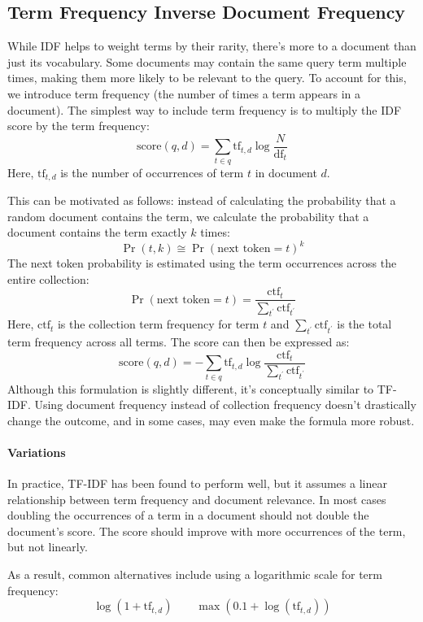 \subsection{Term Frequency Inverse Document Frequency}
While IDF helps to weight terms by their rarity, there's more to a document than just its vocabulary. 
Some documents may contain the same query term multiple times, making them more likely to be relevant to the query. 
To account for this, we introduce term frequency (the number of times a term appears in a document). 
The simplest way to include term frequency is to multiply the IDF score by the term frequency:
\[\text{score}(q,d)=\sum_{t \in q}\text{tf}_{t,d}\log\dfrac{N}{\text{df}_t}\]
Here, $\text{tf}_{t,d}$ is the number of occurrences of term $t$ in document $d$.

This can be motivated as follows: instead of calculating the probability that a random document contains the term, we calculate the probability that a document contains the term exactly $k$ times:
\[\Pr(t,k) \cong  \Pr(\text{next token}=t)^k\]
\noindent The next token probability is estimated using the term occurrences across the entire collection:
\[\Pr(\text{next token} = t) = \frac{\text{ctf}_t}{\sum_{t^\prime}\text{ctf}_{t^{\prime}}}\]
Here, $\text{ctf}_t$ is the collection term frequency for term $t$ and $\sum_{t^\prime}\text{ctf}_{t^{\prime}}$ is the total term frequency across all terms. 
The score can then be expressed as:
\[\text{score}(q,d) = - \sum_{t\in q} \text{tf}_{t,d} \log\frac{\text{ctf}_t}{\sum_{t^\prime}\text{ctf}_{t^\prime}}\] 
\noindent Although this formulation is slightly different, it's conceptually similar to TF-IDF. 
Using document frequency instead of collection frequency doesn't drastically change the outcome, and in some cases, may even make the formula more robust.

\paragraph*{Variations}
In practice, TF-IDF has been found to perform well, but it assumes a linear relationship between term frequency and document relevance. 
In most cases doubling the occurrences of a term in a document should not double the document's score. 
The score should improve with more occurrences of the term, but not linearly.

As a result, common alternatives include using a logarithmic scale for term frequency:
\[\log(1+\text{tf}_{t,d}) \qquad \max(0.1+\log(\text{tf}_{t,d}))\]